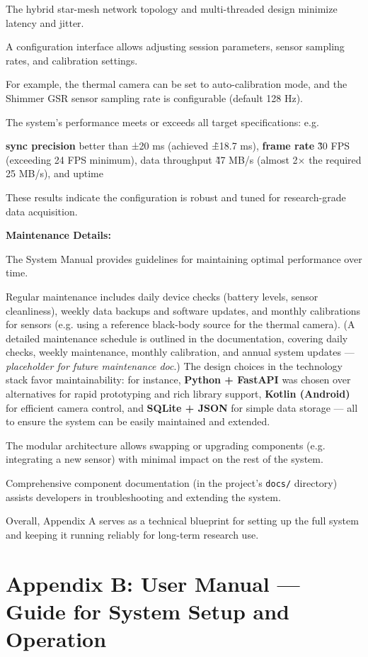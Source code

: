 The hybrid star-mesh network topology and multi-threaded design minimize latency and jitter.

A configuration interface allows adjusting session parameters, sensor sampling rates, and calibration settings.

For example, the thermal camera can be set to auto-calibration mode, and the Shimmer GSR sensor sampling rate is configurable (default 128 Hz).

The system's performance meets or exceeds all target specifications: e.g.

\textbf{sync precision}
 better than ±20 ms (achieved \~±18.7 ms), \textbf{frame rate}
 \~30 FPS (exceeding 24 FPS minimum), data throughput \~47 MB/s (almost 2× the required 25 MB/s), and uptime %

These results indicate the configuration is robust and tuned for research-grade data acquisition.

\textbf{Maintenance Details:}

The System Manual provides guidelines for maintaining optimal performance over time.

Regular maintenance includes daily device checks (battery levels, sensor cleanliness), weekly data backups and software updates, and monthly calibrations for sensors (e.g. using a reference black-body source for the thermal camera). (A detailed maintenance schedule is outlined in the documentation, covering daily checks, weekly maintenance, monthly calibration, and annual system updates --- \textit{placeholder for future maintenance doc}.) The design choices in the technology stack favor maintainability: for instance, \textbf{Python + FastAPI}
 was chosen over alternatives for rapid prototyping and rich library support, \textbf{Kotlin (Android)}
 for efficient camera control, and \textbf{SQLite + JSON}
 for simple data storage --- all to ensure the system can be easily maintained and extended.

The modular architecture allows swapping or upgrading components (e.g. integrating a new sensor) with minimal impact on the rest of the system.

Comprehensive component documentation (in the project's \texttt{docs/} directory) assists developers in troubleshooting and extending the system.

Overall, Appendix A serves as a technical blueprint for setting up the full system and keeping it running reliably for long-term research use.

\section{Appendix B: User Manual --- Guide for System Setup and Operation}

